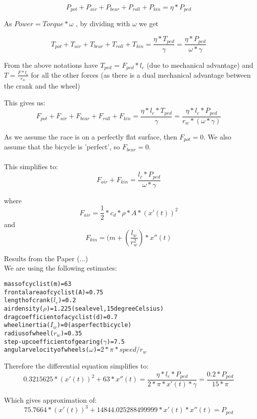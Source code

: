 \documentclass[10pt, a4paper]{report}
\begin{document}
$$P_{pot} + P_{air} + P_{bear} + P_{roll} + P_{kin} = \eta * P_{ped}$$

As $Power = Torque * \omega$ , by dividing with $\omega$ we get

$$ T_{pot} + T_{air} + T_{bear} + T_{roll} + T_{kin} = \frac{ \eta * T_{ped} }{ \gamma }  = \frac{\eta * P_{ped}}{\omega * \gamma} $$

From the above notations have $T_{ped}$ = $F_{ped} * l_{c}$ (due to mechanical advantage) and $T = \frac{F * l_{c}}{r_{w}}$ for all the other forces (as there is a dual mechanical advantage between the crank and the wheel)

This gives us: $$ F_{pot} + F_{air} + F_{bear} + F_{roll} + F_{kin}
	= \frac{ \eta * l_{c} * T_{ped} }{ \gamma }
	= \frac{ \eta * l_{c} * P_{ped} }{ r_{w} * (\omega * \gamma)} $$

As we assume the race is on a perfectly flat surface, then $F_{pot} = 0$. We also assume that the bicycle is 'perfect', so $F_{bear} = 0$. \\\\
This simplifies to: $$F_{air} + F_{kin} = \frac{l_{c} * P_{ped} }{ \omega * \gamma } $$

where $$ F_{air} 	= \frac{1}{2} * c_{d} * \rho * A * ( x'(t) )^{2} $$
and	  $$ F_{kin} 	= ( m + ( \frac{l_w}{r_w^{2}} ) * x''(t) $$

Results from the Paper (...)\\

We are using the following estimates:

\begin{alltt}
mass of cyclist (m) 				= 63
frontal area of cyclist (A) 		= 0.75
length of crank (\(l_{c}\)) 		= 0.2
air density (\(\rho\)) 				= 1.225 (sea level, 15 degree Celsius)
drag coefficient of a cyclist (d) 	= 0.7
wheel inertia (\(I_w\)) = 0 (as perfect bicycle)
radius of wheel (\(r_w\)) = 0.35
step-up coefficient of gearing (\(\gamma\)) = 7.5
angular velocity of wheels (\(\omega\)) = \(2 * \pi * speed / {r_{w}} \)
\end{alltt}

Therefore the differential equation simplifies to:
$$ 0.3215625 * (x'(t))^{2} + 63 * x''(t)
	= \frac{\eta * l_{c} * P_{ped}} {2 * \pi * x'(t) * \gamma }
	= \frac {0.2 * P_{ped}} {15 * \pi} $$

Which gives approximation of:
$$ 75.7664 *(x'(t))^{3} + 14844.025288499999 * x'(t) * x''(t) = P_{ped}$$
\end{document}
